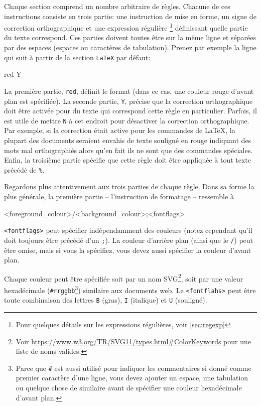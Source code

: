 Chaque section comprend un nombre arbitraire de règles. Chacune de ces instructions consiste en trois partie: une instruction de mise en forme, un signe de correction orthographique et une expression régulière \footnote{Pour quelques détails sur les expressions régulières, voir \ref{sec:regexp}} définissant quelle partie du texte correspond. Ces parties doivent toutes être sur la même ligne et séparées par des espaces (espaces ou caractères de tabulation). Prenez par exemple la ligne qui suit à partir de la section \verb|LaTeX| par défaut:
\begin{verbExample}
red    Y    %
\end{verbExample}
La première partie, \verb|red|, définit le format (dans ce cas, une couleur rouge d'avant plan est spécifiée). La seconde partie, \verb|Y|, précise que la correction orthographique doit être activée pour du texte qui correspond cette règle en particulier. Parfois, il est utile de mettre \verb|N| à cet endroit pour désactiver la correction orthographique. Par exemple, si la correction était active pour les commandes de \LaTeX, la plupart des documents seraient envahis de texte souligné en rouge indiquant des mots mal orthographiés alors qu'en fait ils ne sont que des commandes spéciales. Enfin, la troisième partie spécifie que cette règle doit être appliquée à tout texte précédé de \verb|%|.

Regardons plus attentivement aux trois parties de chaque règle. Dans sa forme la plus générale, la première partie -- l'instruction de formatage -- ressemble à
\begin{verbExample}
<foreground_colour>/<background_colour>;<fontflags>
\end{verbExample}
\verb|<fontflags>| peut spécifier indépendamment des couleurs (notez cependant qu'il doit toujours être précédé d'un \verb|;|). La couleur d'arrière plan (ainsi que le \verb|/|) peut être omise, mais si vous la spécifiez, vous devez aussi spécifier la couleur d'avant plan.

Chaque couleur peut être spécifiée soit par un nom SVG\footnote{Voir \url{https://www.w3.org/TR/SVG11/types.html#ColorKeywords} pour une liste de noms valides.}, soit par une valeur hexadécimale (\verb|#rrggbb|\footnote{Parce que \verb|#| est aussi utilisé pour indiquer les commentaires si donné comme premier caractère d'une ligne, vous devez ajouter un espace, une tabulation ou quelque chose de similaire avant de spécifier une couleur hexadécimale d'avant plan.}) similaire aux documents web. Le \verb|<fontflahs>| peut être toute combinaison des lettres \verb|B| (gras), \verb|I| (italique) et \verb|U| (souligné).

